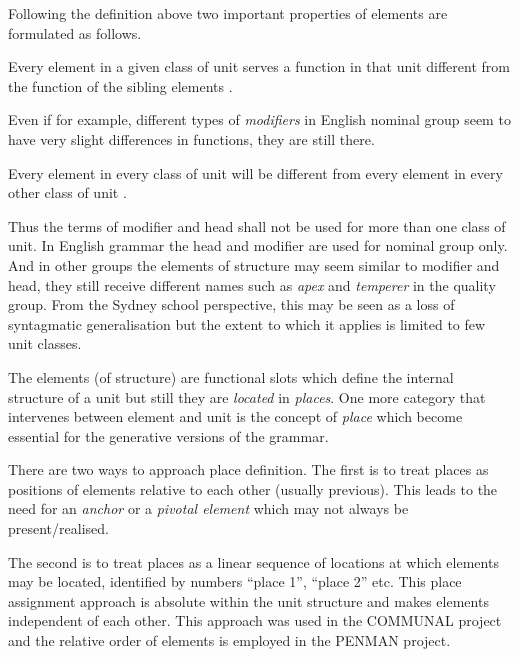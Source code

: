     Following the definition above two important properties of elements are formulated as follows.
    
    \begin{generalization}
    Every element in a given class of unit serves a function in that unit different from the function of the sibling elements \citep[214]{Fawcett2000}. 
    \end{generalization} 
    
    Even if for example, different types of \textit{modifiers} in English nominal group seem to have very slight differences in functions, they are still there.
    
    \begin{generalization}
        Every element in every class of unit will be different from every element in every other class of unit \citep[214]{Fawcett2000}. 
    \end{generalization} 
    
    Thus the terms of modifier and head shall not be used for more than one class of unit. In English grammar the head and modifier are used for nominal group only. And in other groups the elements of structure may seem similar to modifier and head, they still receive different names such as \textit{apex} and \textit{temperer} in the quality group. From the Sydney school perspective, this may be seen as a loss of syntagmatic generalisation but the extent to which it applies is limited to few unit classes.
    
    The elements (of structure) are functional slots which define the internal structure of a unit but still they are \textit{located} in \textit{places}. One more category that intervenes between element and unit is the concept of \textit{place} which become essential for the generative versions of the grammar.
    
    There are two ways to approach place definition. The first is to treat places as positions of elements relative to each other (usually previous). This leads to the need for an \textit{anchor} or a \textit{pivotal element} which may not always be present/realised.
    
    The second is to treat places as a linear sequence of locations at which elements may be located, identified by numbers ``place 1'', ``place 2'' etc. This place assignment approach is absolute within the unit structure and makes elements independent of each other. This approach was used in the COMMUNAL \citep{Fawcett90-communal} project and the relative order of elements is employed in the PENMAN \citep{PenmanOverview} project. 

